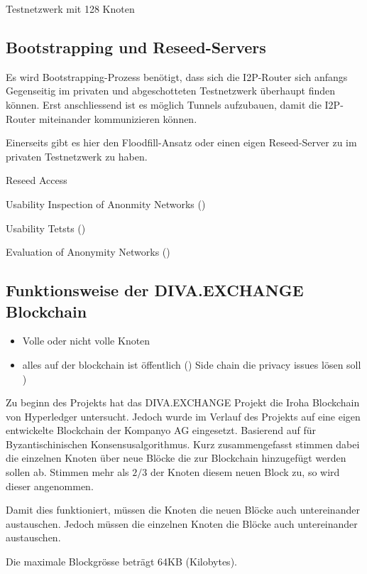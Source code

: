 Testnetzwerk mit 128 Knoten 
\cite{noauthor_how_2018}
\parencite[S. 25-26]{muller_analysis_2016}

\subsection{Bootstrapping und Reseed-Servers}

Es wird Bootstrapping-Prozess benötigt, dass sich die I2P-Router sich anfangs Gegenseitig im privaten und abgeschotteten Testnetzwerk überhaupt finden können.
Erst anschliessend ist es möglich Tunnels aufzubauen, damit die I2P-Router miteinander kommunizieren können.


Einerseits gibt es hier den Floodfill-Ansatz oder einen eigen Reseed-Server zu im privaten Testnetzwerk zu haben.

Reseed Access
\cite{noauthor_i2p_nodate-7}

Usability Inspection of Anonmity Networks
(\cite{abou-tair_usability_2009})

Usability Tetsts
(\cite{schomburg_anonymity_2009})

Evaluation of Anonymity Networks
(\cite{timpanaro_evaluation_2015})

\subsection{Funktionsweise der DIVA.EXCHANGE Blockchain}\label{sec:divaxblockchain}
%

\begin{itemize}
    \item Volle oder nicht volle Knoten
    \item alles auf der blockchain ist öffentlich () Side chain die privacy issues lösen soll \parencite[S. 8-9]{parizi_integrating_2019})
\end{itemize}

%
Zu beginn des Projekts hat das DIVA.EXCHANGE Projekt die Iroha Blockchain von Hyperledger untersucht.
Jedoch wurde im Verlauf des Projekts auf eine eigen entwickelte Blockchain der Kompanyo AG eingesetzt.
Basierend auf für Byzantischinischen Konsensusalgorithmus.
Kurz zusammengefasst stimmen dabei die einzelnen Knoten über neue Blöcke die zur Blockchain hinzugefügt werden sollen ab.
Stimmen mehr als $2/3$ der Knoten diesem neuen Block zu, so wird dieser angenommen.

Damit dies funktioniert, müssen die Knoten die neuen Blöcke auch untereinander austauschen.
Jedoch müssen die einzelnen Knoten die Blöcke auch untereinander austauschen.

Die maximale Blockgrösse beträgt 64KB (Kilobytes).
%

